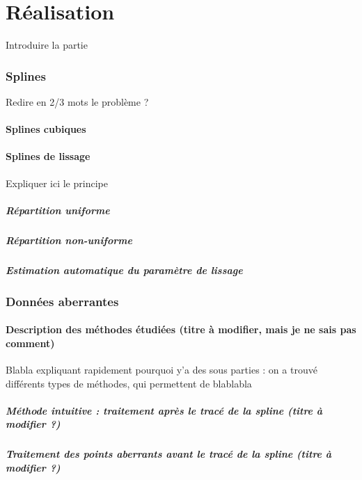 \documentclass[a4paper,12pt]{article} %
\begin{document}
\part{Réalisation}
	Introduire la partie
	\section{Splines}
		Redire en 2/3 mots le problème ?
		\subsection{Splines cubiques}
		\subsection{Splines de lissage}
			Expliquer ici le principe
			\subsubsection{Répartition uniforme}
			\subsubsection{Répartition non-uniforme}
			\subsubsection{Estimation automatique du paramètre de lissage}

	\section{Données aberrantes}

		\subsection{Description des méthodes étudiées (titre à modifier, mais je ne sais pas comment)}
		Blabla expliquant rapidement pourquoi y'a des sous parties : on a trouvé différents types de méthodes, qui permettent de blablabla
			\subsubsection{Méthode intuitive : traitement après le tracé de la spline (titre à modifier ?)}
			\subsubsection{Traitement des points aberrants avant le tracé de la spline (titre à modifier ?)}
\end{document}
